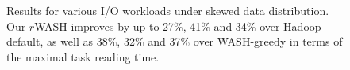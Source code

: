\documentclass[conference]{IEEEtran}
\begin{document}
\begin{figure}[!t]
	\centering
	\quad\quad %
	\quad\quad
	\vspace{-1ex}
	\caption{Results for various I/O workloads under skewed data distribution. Our $r$WASH improves by up to 27\%, 41\% and 34\% over Hadoop-default, as well as 38\%, 32\% and 37\% over WASH-greedy in terms of the maximal task reading time.
	}
	\label{Fig:unbalance}
	\vspace{-0.35cm}
\end{figure}

\end{document}
